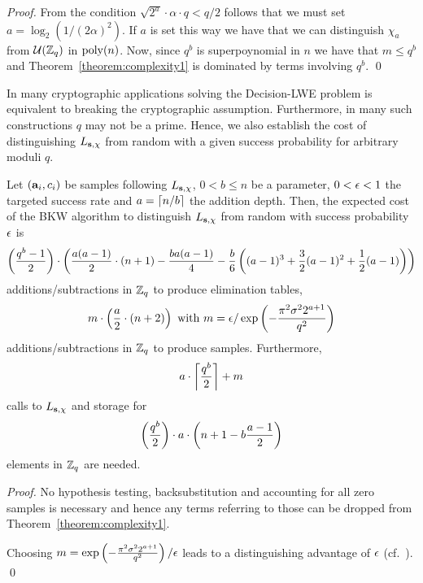 \begin{proof}
From the condition $\sqrt{2^a} \cdot \alpha \cdot q  < q/2$ follows that we must set $a = \log_2(1/(2\alpha)^2)$. If $a$ is set this way we have that we can distinguish $\chi_a$ from $\mathcal{U}(\mathbb{Z}_q)$ in ${\rm poly}(n)$. Now, since $q^b$ is superpoynomial in $n$ we have that  $m \leq q^b$ and Theorem~\ref{theorem:complexity1} is dominated by terms involving $q^b$. \qed
\end{proof}

In many cryptographic applications solving the Decision-LWE problem is equivalent to breaking the cryptographic assumption. Furthermore, in many such constructions $q$ may not be a prime. Hence, we also establish the cost of distinguishing $L_{\mathbf{s},\chi}$ from random with a given success probability for arbitrary moduli $q$.
\begin{corollary}\label{cor:distinguish}
Let $(\mathbf{a}_i,c_i)$ be samples following $L_{\mathbf{s},\chi}$, $0 < b \leq n$ be a parameter, $0 < \epsilon < 1$ the targeted success rate and $a = \lceil n/b \rceil$ the addition depth. Then, the expected cost of the BKW algorithm to distinguish $L_{\mathbf{s},\chi}$ from random with success probability $\epsilon$ is
\begin{equation}\left(\frac{q^b-1}{2}\right)\cdot \left( \frac{a(a-1)}{2}\cdot (n+1) - \frac{ba(a-1)}{4}-\frac{b}{6}\left((a-1)^3+\frac{3}{2}(a-1)^2+\frac{1}{2}(a-1)\right) \right)\end{equation}
additions/subtractions in $\mathbb{Z}_q$ to produce elimination tables,
\begin{equation}m\cdot\left(\frac{a}{2}\cdot(n+2)\right) \textnormal{ with } m = \epsilon/\exp\left(-\frac{\pi^{2} \sigma^{2} 2^{{a + 1}}}{q^{2}}\right)\end{equation}
additions/subtractions in $\mathbb{Z}_q$ to produce samples. Furthermore,
\begin{equation}a\cdot \left\lceil \frac{q^b}{2}\right\rceil + m \end{equation}
calls to $L_{\mathbf{s},\chi}$ and storage for
\begin{equation}\left( \frac{q^b}{2} \right) \cdot a\cdot \left(n+1 - b\frac{a-1}{2}\right)\end{equation}
elements in $\mathbb{Z}_q$ are needed.
\end{corollary}

\begin{proof}
No hypothesis testing, backsubstitution and accounting for all zero samples is necessary and hence any terms referring to those can be dropped from Theorem~\ref{theorem:complexity1}.

Choosing $m = \exp\left(-\frac{\pi^{2} \sigma^{2} 2^{{a + 1}}}{q^{2}}\right)/\epsilon$ leads to a distinguishing advantage of $\epsilon$ (cf.\ \cite{LindnerP10}). \qed
\end{proof}


